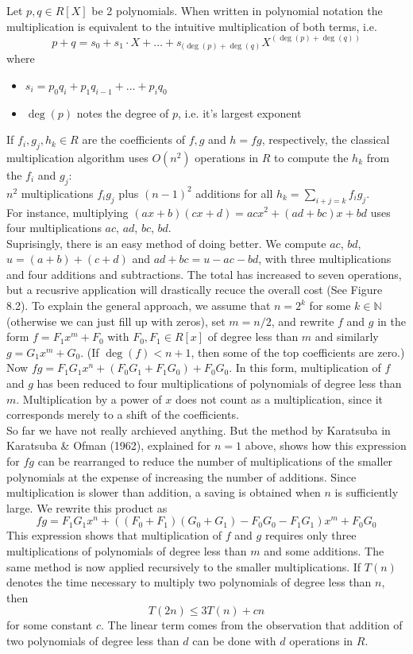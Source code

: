 \documentclass{article}
\begin{document}
\begin{note}
	Let $p,q \in R[X]$ be 2 polynomials. When written in polynomial notation the multiplication is equivalent
	to the intuitive multiplication of both terms, i.e.
	\[
		p+q = s_0 + s_1 \cdot X + \dots + s_{(\deg(p)+\deg(q)} X^{(\deg(p)+\deg(q))}
	\]
	where
	\begin{itemize}
		\item $s_i = p_0q_i + p_1 q_{i-1} + \dots + p_i q_0$
		\item $\deg(p)$ notes the degree of $p$, i.e. it's largest exponent
	\end{itemize}
\end{note}
If $f_i, g_j, h_k \in R$ are the coefficients of $f,g$ and $h=fg$, respectively, the classical multiplication
algorithm uses $O(n^2)$ operations in $R$ to compute the $h_k$ from the $f_i$ and $g_j$:\\
$n^2$ multiplications $f_i g_j$ plus $(n-1)^2$ additions for all $h_k = \sum_{i+j=k} f_i g_j$.\\
For instance, multiplying $(ax+b)(cx+d) = acx^2 + (ad+bc)x+bd$ uses four multiplications $ac$, $ad$, $bc$, $bd$.\\

Suprisingly, there is an easy method of doing better. We compute $ac$, $bd$, $u=(a+b)+(c+d)$ and $ad+bc=u-ac-bd$,
with three multiplications and four additions and subtractions. The total has increased to seven operations, but
a recusrive application will drastically recuce the overall cost (See Figure 8.2).
To explain the general approach, we assume that $n=2^k$ for some $k \in \mathbb{N}$ (otherwise we can just fill
up with zeros), set $m = n/2$, and rewrite
$f$ and $g$ in the form $f = F_1x^m + F_0$ with $F_0, F_1 \in R[x]$ of degree less than $m$ and similarly
$g = G_1 x^m + G_0$. (If $\deg(f) < n+1$, then some of the top coefficients are zero.)
Now $fg = F_1G_1 x^n + (F_0G_1+F_1G_0) + F_0G_0$. In this form, multiplication of $f$ and $g$ has been reduced
to four multiplications of polynomials of degree less than $m$. Multiplication by a power of $x$ does not count
as a multiplication, since it corresponds merely to a shift of the coefficients.\\

So far we have not really archieved anything. But the method by Karatsuba in Karatsuba \& Ofman (1962), explained
for $n=1$ above, shows how this expression for $fg$ can be rearranged to reduce the number of multiplications
of the smaller polynomials at the expense of increasing the number of additions. Since multiplication is slower
than addition, a saving is obtained when $n$ is sufficiently large. We rewrite this product as
\[
	fg = F_1 G_1 x^n + ((F_0 + F_1)(G_0+G_1) - F_0 G_0 - F_1 G_1) x^m + F_0 G_0
\]
This expression shows that multiplication of $f$ and $g$ requires only three multiplications of polynomials of
degree less than $m$ and some additions. The same method is now applied recursively to the smaller
multiplications. If $T(n)$ denotes the time necessary to multiply two polynomials of degree less than $n$, then
\[
	T(2n) \leq 3T(n) + cn
\]
for some constant $c$. The linear term comes from the observation that addition of two polynomials of degree
less than $d$ can be done with $d$ operations in $R$.%
\end{document}
